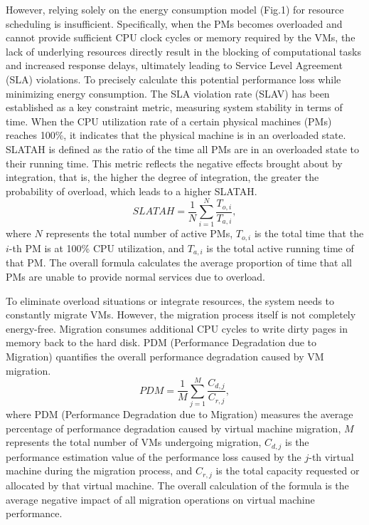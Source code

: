 \documentclass[conference]{{IEEEtran}}
\begin{document}
However, relying solely on the energy consumption model (Fig.1) for resource scheduling is insufficient. Specifically, when the PMs becomes overloaded and cannot provide sufficient CPU clock cycles or memory required by the VMs, the lack of underlying resources directly result in the blocking of computational tasks and increased response delays, ultimately leading to Service Level Agreement (SLA) violations. To precisely calculate this potential performance loss while minimizing energy consumption. The SLA violation rate (SLAV) has been established as a key constraint metric, measuring system stability in terms of time. When the CPU utilization rate of a certain physical machines (PMs) reaches 100\%, it indicates that the physical machine is in an overloaded state. SLATAH is defined as the ratio of the time all PMs are in an overloaded state to their running time. This metric reflects the negative effects brought about by integration, that is, the higher the degree of integration, the greater the probability of overload, which leads to a higher SLATAH.\begin{equation}
    SLATAH = \frac{1}{N} \sum_{i=1}^{N} \frac{T_{o,i}}{T_{a,i}},
    \label{eq:slatah}
   \end{equation}
where $N$ represents the total number of active PMs, $T_{o,i}$ is the total time that the $i$-th PM is at 100\% CPU utilization, and $T_{a,i}$ is the total active running time of that PM. The overall formula calculates the average proportion of time that all PMs are unable to provide normal services due to overload.

To eliminate overload situations or integrate resources, the system needs to constantly migrate VMs\cite{liu2025impact}. However, the migration process itself is not completely energy-free. Migration consumes additional CPU cycles to write dirty pages in memory back to the hard disk. PDM (Performance Degradation due
to Migration) quantifies the overall performance degradation caused by VM migration.
\begin{equation}
    PDM = \frac{1}{M} \sum_{j=1}^{M} \frac{C_{d,j}}{C_{r,j}},
    \label{eq:pdm}
    \end{equation}
where PDM (Performance Degradation due to Migration) measures the average percentage of performance degradation caused by virtual machine migration, $M$ represents the total number of VMs undergoing migration, $C_{d,j}$ is the performance estimation value of the performance loss caused by the $j$-th virtual machine during the migration process, and $C_{r,j}$ is the total capacity requested or allocated by that virtual machine. The overall calculation of the formula is the average negative impact of all migration operations on virtual machine performance.
\end{document}
